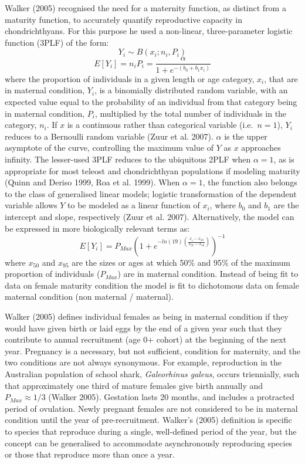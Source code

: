 \documentclass[
]{article}
\begin{document}
Walker (2005) recognised the need for a maternity function, as distinct from a maturity function, to accurately quantify reproductive capacity in chondrichthyans. For this purpose he used a non-linear, three-parameter logistic function (3PLF) of the form: \[Y_i \sim B(x_i; n_i, P_i)\] \[E[Y_i] = n_iP_i = \frac{\alpha}{1 + e^{-(b_0 + b_1x_i)}}\] where the proportion of individuals in a given length or age category, \(x_i\), that are in maternal condition, \(Y_i\), is a binomially distributed random variable, with an expected value equal to the probability of an individual from that category being in maternal condition, \(P_i\), multiplied by the total number of individuals in the category, \(n_i\). If \(x\) is a continuous rather than categorical variable (i.e.~\(n = 1\)), \(Y_i\) reduces to a Bernoulli random variable (Zuur et al. 2007). \(\alpha\) is the upper asymptote of the curve, controlling the maximum value of \(Y\) as \(x\) approaches infinity. The lesser-used 3PLF reduces to the ubiquitous 2PLF when \(\alpha = 1\), as is appropriate for most teleost and chondrichthyan populations if modeling maturity (Quinn and Deriso 1999, Roa et al. 1999). When \(\alpha = 1\), the function also belongs to the class of generalised linear models; logistic transformation of the dependent variable allows \(Y\) to be modeled as a linear function of \(x_i\), where \(b_0\) and \(b_1\) are the intercept and slope, respectively (Zuur et al. 2007). Alternatively, the model can be expressed in more biologically relevant terms as: \[E[Y_i] = P_{Max} \left ( 1 + e^{-ln(19)\left ( \frac{x_i - x_{50}}{x_{95} - x_{50}} \right )}  \right )^{-1} \] where \(x_{50}\) and \(x_{95}\) are the sizes or ages at which 50\% and 95\% of the maximum proportion of individuals (\(P_{Max}\)) are in maternal condition. Instead of being fit to data on female maturity condition the model is fit to dichotomous data on female maternal condition (non maternal / maternal).

Walker (2005) defines individual females as being in maternal condition if they would have given birth or laid eggs by the end of a given year such that they contribute to annual recruitment (age 0+ cohort) at the beginning of the next year. Pregnancy is a necessary, but not sufficient, condition for maternity, and the two conditions are not always synonymous. For example, reproduction in the Australian population of school shark, \emph{Galeorhinus galeus}, occurs triennially, such that approximately one third of mature females give birth annually and \(P_{Max} \approx 1/3\) (Walker 2005). Gestation lasts 20 months, and includes a protracted period of ovulation. Newly pregnant females are not considered to be in maternal condition until the year of pre-recruitment. Walker's (2005) definition is specific to species that reproduce during a single, well-defined period of the year, but the concept can be generalised to accommodate asynchronously reproducing species or those that reproduce more than once a year.
\end{document}
